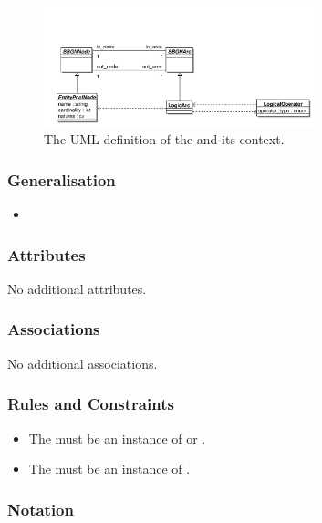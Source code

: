 \begin{figure}[htb]
  \centering
  \includegraphics[width = 0.7\textwidth]{images/logicarcuml}
  \caption{The UML definition of the  and its context.}
  \label{fig:logicarcuml}
\end{figure}

\subsubsection{Generalisation}

\begin{itemize}
\item {}
\end{itemize}

\subsubsection{Attributes}

No additional attributes.

\subsubsection{Associations}

No additional associations.

\subsubsection{Rules and Constraints}

\begin{itemize}
\item The  must be an instance of
   or .
\item The  must be an instance of
  .
\end{itemize}

\subsubsection{Notation}

